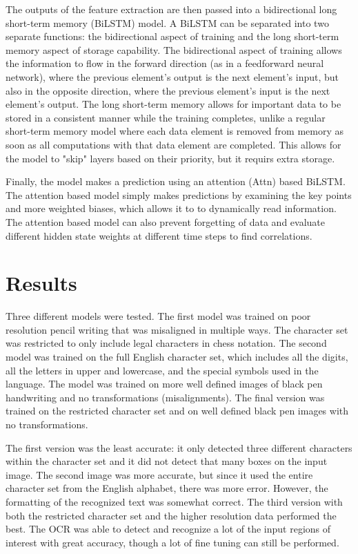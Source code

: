 \documentclass[12pt, two column, letterpaper]{article}
\begin{document}
The outputs of the feature extraction are then passed into a bidirectional long short-term memory (BiLSTM) model. A BiLSTM can be separated into two separate functions: the bidirectional aspect of training and the long short-term memory aspect of storage capability. The bidirectional aspect of training allows the information to flow in the forward direction (as in a feedforward neural network), where the previous element's output is the next element's input, but also in the opposite direction, where the previous element's input is the next element's output. The long short-term memory allows for important data to be stored in a consistent manner while the training completes, unlike a regular short-term memory model where each data element is removed from memory as soon as all computations with that data element are completed. This allows for the model to "skip" layers based on their priority, but it requirs extra storage.

Finally, the model makes a prediction using an attention (Attn) based BiLSTM. The attention based model simply makes predictions by examining the key points and more weighted biases, which allows it to to dynamically read information.
The attention based model can also prevent forgetting of data and evaluate different hidden state weights at different time steps to find correlations.


\newpage


\section{Results}
Three different models were tested. The first model was trained on poor resolution pencil writing that was misaligned in multiple ways. The character set was restricted to only include legal characters in chess notation. The second model was trained on the full English character set, which includes all the digits, all the letters in upper and lowercase, and the special symbols used in the language. The model was trained on more well defined images of black pen handwriting and no transformations (misalignments). The final version was trained on the restricted character set and on well defined black pen images with no transformations.

The first version was the least accurate: it only detected three different characters within the character set and it did not detect that many boxes on the input image. The second image was more accurate, but since it used the entire character set from the English alphabet, there was more error. However, the formatting of the recognized text was somewhat correct. The third version with both the restricted character set and the higher resolution data performed the best. The OCR was able to detect and recognize a lot of the input regions of interest with great accuracy, though a lot of fine tuning can still be performed.
\end{document}
